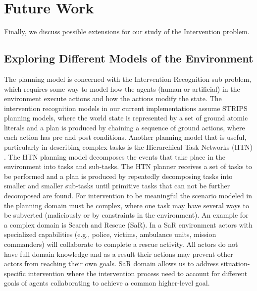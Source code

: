 \section{Future Work}
Finally, we discuss possible extensions for our study of the Intervention problem.

\subsection{Exploring Different Models of the Environment}
The planning model is concerned with the Intervention Recognition sub problem, which requires some way to model how the agents (human or artificial) in the environment execute actions and how the actions modify the state.
The intervention recognition models in our current implementations assume STRIPS planning models, where
the world state is represented by a set of ground atomic literals and a plan is produced by chaining a sequence of ground actions, where each action has pre and post conditions.
Another planning model that is useful, particularly in describing complex tasks is the Hierarchical Task Networks (HTN) \cite{erol1995htn}.
The HTN planning model decomposes the events that take place in the environment into tasks and sub-tasks.
The HTN planner receives a set of tasks to be performed and a plan is produced by repeatedly decomposing tasks into smaller and smaller sub-tasks until primitive tasks that can not be further decomposed are found.
For intervention to be meaningful the scenario modeled in the planning domain must be complex, where one task may have several ways to be subverted (maliciously or by constraints in the environment).
An example for a complex domain is Search and Rescue (SaR).
In a SaR environment actors with specialized capabilities (e.g., police, victims, ambulance units, mission commanders) will collaborate to complete a rescue activity. 
All actors do not have full domain knowledge and as a result their actions may prevent other actors from reaching their own goals. 
SaR domain allows us to address situation-specific intervention where the intervention process need to account for different goals of agents collaborating to achieve a common higher-level goal.

